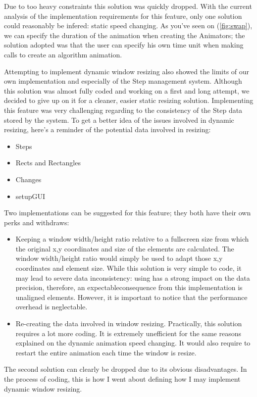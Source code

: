 \documentclass{l3proj}
\begin{document}
Due to too heavy constraints this solution was quickly dropped. With the current analysis of the implementation requirements for this feature, only one solution could reasonably be infered: static speed changing. As you've seen on (\ref{fig:swap}), we can specify the duration of the animation when creating the Animators; the solution adopted was that the user can specify his own time unit when making calls to create an algorithm animation. 

Attempting to implement dynamic window resizing also showed the limits of our own implementation and especially of the Step management system. Although this solution was almost fully coded and working on a first and long attempt, we decided to give up on it for a cleaner, easier static resizing solution. Implementing this feature was very challenging regarding to the consistency of the Step data stored by the system. To get a better idea of the issues involved in dynamic resizing, here's a reminder of the potential data involved in resizing:
\begin{itemize}
\item Steps
\item Rects and Rectangles
\item Changes
\item setupGUI
\end{itemize}

Two implementations can be suggested for this feature; they both have their own perks and withdraws:
\begin{itemize}
\item Keeping a window width/height ratio relative to a fullscreen size from which the original x,y coordinates and size of the elements are calculated. The window width/height ratio would simply be used to adapt those x,y coordinates and element size. While this solution is very simple to code, it may lead to severe data inconsistency: using has a strong impact on the data precision, therefore, an expectableconsequence from this implementation is unaligned elements. However, it is important to notice that the performance overhead is neglectable.
\item Re-creating the data involved in window resizing. Practically, this solution requires a lot more coding. It is extremely unefficient for the same reasons explained on the dynamic animation speed changing. It would also require to restart the entire animation each time the window is resize.
\end{itemize}

The second solution can clearly be dropped due to its obvious disadvantages. In the process of coding, this is how I went about defining how I may implement dynamic window resizing.
\end{document}

